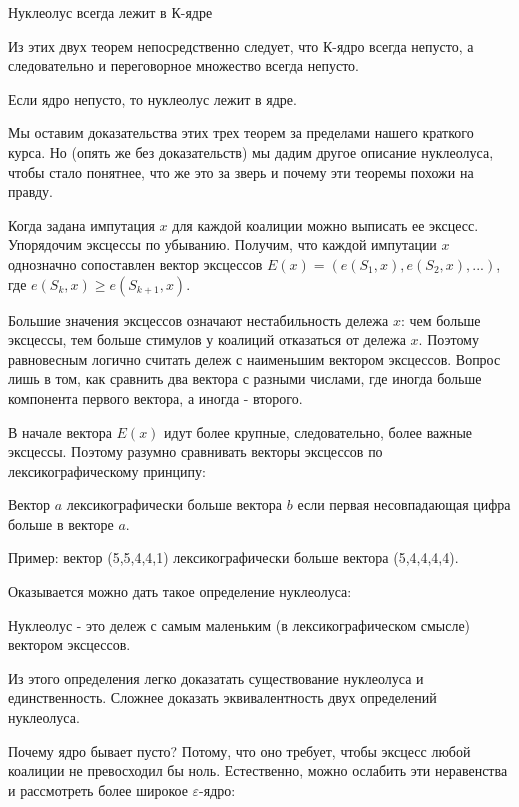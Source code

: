 \begin{theorem}
Нуклеолус всегда лежит в К-ядре
\end{theorem}

Из этих двух теорем непосредственно следует, что К-ядро всегда непусто, а следовательно и переговорное множество всегда непусто.

\begin{theorem}
Если ядро непусто, то нуклеолус лежит в ядре.
\end{theorem}


Мы оставим доказательства этих трех теорем за пределами нашего краткого курса. Но (опять же без доказательств) мы дадим другое описание нуклеолуса, чтобы стало понятнее, что же это за зверь и почему эти теоремы похожи на правду.

Когда задана импутация $x$ для каждой коалиции можно выписать ее эксцесс. Упорядочим эксцессы по убыванию. Получим, что каждой импутации $x$ однозначно сопоставлен вектор эксцессов $E(x)=(e(S_{1},x),e(S_{2},x),...)$, где $e(S_{k},x)\geq e(S_{k+1},x)$.

Большие значения эксцессов означают нестабильность дележа $x$: чем больше эксцессы, тем больше стимулов у коалиций отказаться от дележа $x$. Поэтому равновесным логично считать дележ с наименьшим вектором эксцессов. Вопрос лишь в том, как сравнить два вектора с разными числами, где иногда больше компонента первого вектора, а иногда - второго.

В начале вектора $E(x)$ идут более крупные, следовательно, более важные эксцессы. Поэтому разумно сравнивать векторы эксцессов по лексикографическому принципу:

\begin{definition}
Вектор $a$ лексикографически больше вектора $b$ если первая несовпадающая цифра больше в векторе $a$.
\end{definition}

Пример: вектор (5,5,4,4,1) лексикографически больше вектора (5,4,4,4,4).

Оказывается можно дать такое определение нуклеолуса:
\begin{definition}
Нуклеолус - это дележ с самым маленьким (в лексикографическом смысле) вектором эксцессов.
\end{definition}

Из этого определения легко доказатать существование нуклеолуса и единственность. Сложнее доказать эквивалентность двух определений нуклеолуса.

Почему ядро бывает пусто? Потому, что оно требует, чтобы эксцесс любой коалиции не превосходил бы ноль. Естественно, можно ослабить эти неравенства и рассмотреть более широкое $\varepsilon$-ядро:

